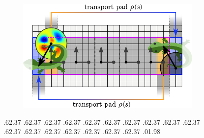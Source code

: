\begin{figure}
	\begin{subfigure}[t!]{.6\linewidth}
		\includegraphics[width=\linewidth]{figures/mobius_conv_numerical.pdf}
	\end{subfigure}
	\par
	\vspace*{\dimexpr-\parskip-160.pt\relax}%
	.62\textwidth .37\textwidth %
	.62\textwidth .37\textwidth
	.62\textwidth .37\textwidth
	.62\textwidth .37\textwidth
	.62\textwidth .37\textwidth
	.62\textwidth .37\textwidth
	.62\textwidth .37\textwidth
	.62\textwidth .37\textwidth
	.62\textwidth .37\textwidth
	.62\textwidth .37\textwidth
	.62\textwidth .37\textwidth
	.62\textwidth .37\textwidth
	.62\textwidth .37\textwidth
	.62\textwidth .37\textwidth
	.62\textwidth .37\textwidth
	.62\textwidth .37\textwidth
	.62\textwidth .37\textwidth
	.01\textwidth .98\textwidth %
	\makeatletter
	{\protect{}}%
	\small %

\end{figure}
